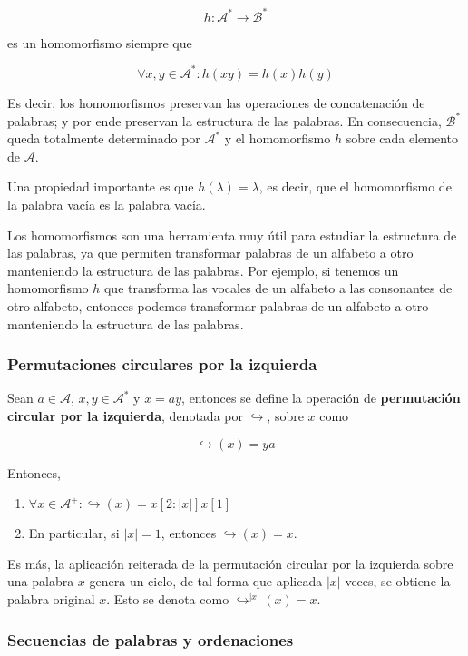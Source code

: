 \[
h:\mathcal{A}^*\rightarrow\mathcal{B}^*
\]

es un homomorfismo siempre que

\[
\forall x,y\in\mathcal{A}^*:h(xy)=h(x)h(y)
\]

Es decir, los homomorfismos preservan las operaciones de concatenación
de palabras; y por ende preservan la estructura de las palabras. En
consecuencia, \(\mathcal{B}^*\) queda totalmente determinado por
\(\mathcal{A}^*\) y el homomorfismo \(h\) sobre cada elemento de
\(\mathcal{A}\).

Una propiedad importante es que \(h(\lambda)=\lambda\), es decir, que el
homomorfismo de la palabra vacía es la palabra vacía.

Los homomorfismos son una herramienta muy útil para estudiar la
estructura de las palabras, ya que permiten transformar palabras de un
alfabeto a otro manteniendo la estructura de las palabras. Por ejemplo,
si tenemos un homomorfismo \(h\) que transforma las vocales de un
alfabeto a las consonantes de otro alfabeto, entonces podemos
transformar palabras de un alfabeto a otro manteniendo la estructura de
las palabras.

\subsubsection{Permutaciones circulares por la
izquierda}\label{permutaciones-circulares-por-la-izquierda}

Sean \(a\in\mathcal{A}\), \(x,y\in\mathcal{A}^*\) y \(x = ay\), entonces
se define la operación de \textbf{permutación circular por la
izquierda}, denotada por \(\hookrightarrow\), sobre \(x\) como

\[
\hookrightarrow(x) = ya
\]

Entonces,

\begin{enumerate}
\def\labelenumi{\arabic{enumi}.}
\tightlist
\item
  \(\forall x\in\mathcal{A}^+:\hookrightarrow(x)=x[2:|x|]x[1]\)
\item
  En particular, si \(|x| = 1\), entonces \(\hookrightarrow(x) = x\).
\end{enumerate}

Es más, la aplicación reiterada de la permutación circular por la
izquierda sobre una palabra \(x\) genera un ciclo, de tal forma que
aplicada \(|x|\) veces, se obtiene la palabra original \(x\). Esto se
denota como \(\hookrightarrow^{|x|}(x) = x\).

\subsubsection{Secuencias de palabras y
ordenaciones}\label{secuencias-de-palabras-y-ordenaciones}


